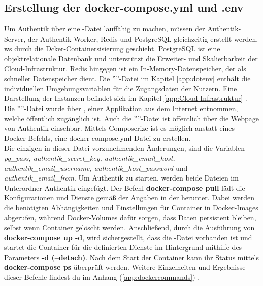 \subsection{Erstellung der docker-compose.yml und .env}
\label{sec:Erstellung der docker-compose.yml .env}
Um Authentik über eine \textit{}-Datei lauffähig zu machen, müssen der Authentik-Server, der Authentik-Worker, 
Redis und PostgreSQL gleichzeitig erstellt werden, ws durch die Dcker-Containersisierung geschieht. 
PostgreSQL ist eine objektrelationale Datenbank und unterstützt 
die Erweiter- und Skalierbarkeit der Cloud-Infrastruktur. Redis hingegen ist ein In-Memory-Datenspeicher, der als 
schneller Datenspeicher dient. Die ''''-Datei im Kapitel \ref{app:dotenv}  
enthält die individuellen Umgebungsvariablen für die Zugangsdaten der Nutzern. 
Eine Darstellung der Instanzen befindet sich im Kapitel \ref{app:Cloud-Infrastruktur} . 
Die ''''-Datei wurde über \cite{Composerize}, einer 
Applikation aus dem Internet entnommen, welche öffentlich zugänglich ist. Auch die ''''-Datei ist öffentlich über die 
Webpage von Authentik einsehbar. Mittels Composerize ist es möglich anstatt eines Docker-Befehls, eine docker-compose.yml-Datei zu erstellen.
\\Die einzigen in dieser Datei vorzunehmenden Änderungen, sind die Variablen 
\textit{pg\_pass, authentik\_secret\_key, authentik\_email\_host, authentik\_email\_username, authentik\_host\_password} und \textit{authentik\_email\_from}.
Um Authentik zu starten, werden beide Dateien im Unterordner Authentik eingefügt. 
Der Befehl \textbf{docker-compose pull} lädt die Konfigurationen und Dienste gemäß der Angaben in der \textbf{} herunter. 
Dabei werden die benötigten Abhängigkeiten und Einstellungen für Container in Docker-Images abgerufen, während Docker-Volumes dafür sorgen, dass 
Daten persistent bleiben, selbst wenn Container gelöscht werden. Anschließend, durch die Ausführung von \textbf{docker-compose up -d}, 
wird sichergestellt, dass die -Datei vorhanden ist und startet die Container für die definierten Dienste 
im Hintergrund mithilfe des Parameters \textbf{-d (--detach)}. Nach dem Start der Container kann ihr Status mittels \textbf{docker-compose ps} 
überprüft werden. Weitere Einzelheiten und Ergebnisse dieser Befehle findest du im Anhang (\ref{app:dockercommands}) .

